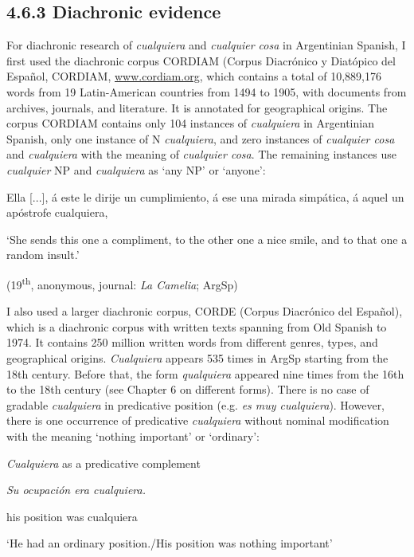 \subsection{\textbf{4.6.3} \textbf{Diachronic} \textbf{evidence}}

For diachronic research of \textit{cualquiera} and \textit{cualquier cosa} in Argentinian Spanish, I first used the diachronic corpus CORDIAM (Corpus Diacrónico y Diatópico del Español, CORDIAM, \href{http://www.cordiam.org}{www.cordiam.org}, which contains a total of 10,889,176 words from 19 Latin-American countries from 1494 to 1905, with documents from archives, journals, and literature. It is annotated for geographical origins. The corpus CORDIAM contains only 104 instances of \textit{cualquiera} in Argentinian Spanish, only one instance of N \textit{cualquiera}, and zero instances of \textit{cualquier cosa} and \textit{cualquiera} with the meaning of \textit{cualquier cosa}. The remaining instances use \textit{cualquier} NP and \textit{cualquiera} as ‘any NP’ or ‘anyone’: 

    Ella [...], á este le dirije un cumplimiento, á ese una mirada simpática, á aquel un apóstrofe cualquiera,

    ‘She sends this one a compliment, to the other one a nice smile, and to that one a random insult.’

{    (19}{\textsuperscript{th}}{, anonymous, journal:} {\textit{La Camelia}}{; ArgSp)}

I also used a larger diachronic corpus, CORDE (Corpus Diacrónico del Español), which is a diachronic corpus with written texts spanning from Old Spanish to 1974. It contains 250 million written words from different genres, types, and geographical origins. \textit{Cualquiera} appears 535 times in ArgSp starting from the 18th century. Before that, the form \textit{qualquiera} appeared nine times from the 16th to the 18th century (see Chapter 6 on different forms). There is no case of gradable \textit{cualquiera} in predicative position (e.g. \textit{es muy cualquiera}). However, there is one occurrence of predicative \textit{cualquiera} without nominal modification with the meaning ‘nothing important’ or ‘ordinary’: 

\label{bkm:Ref150787886}  \textit{Cualquiera} as a predicative complement

    \textit{Su ocupación era cualquiera.}

    his position was cualquiera

    ‘He had an ordinary position./His position was nothing important’

